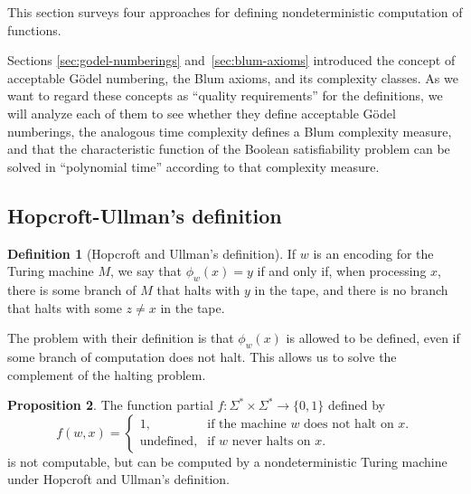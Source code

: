 \documentclass[12pt]{article}
\theoremstyle{definition}
\newtheorem{definition}{Definition}
\newtheorem{proposition}[definition]{Proposition}
\begin{document}
This section surveys four approaches
for defining nondeterministic computation of functions.

Sections \ref{sec:godel-numberings} and~\ref{sec:blum-axioms}
introduced the concept of acceptable Gödel numbering,
the Blum axioms,
and its complexity classes.
As we want to regard these concepts as ``quality requirements''
for the definitions,
we will analyze each of them to see whether they define acceptable Gödel numberings,
the analogous time complexity defines a Blum complexity measure,
and that the characteristic function of the Boolean satisfiability problem
can be solved in ``polynomial time'' according to that complexity measure.

\subsection{Hopcroft-Ullman's definition}
\label{sec:hopcroft-ullman}

\begin{definition}[Hopcroft and Ullman's definition\footnotemark]
    If $w$ is an encoding for the Turing machine $M$,
    we say that $\phi_w(x) = y$ if and only if,
    when processing $x$,
    there is some branch of $M$ that halts with $y$ in the tape,
    and there is no branch that halts with some $z \neq x$ in the tape.
\end{definition}

The problem with their definition is that $\phi_w(x)$ is allowed to be defined,
even if some branch of computation does not halt.
This allows us to solve the complement of the halting problem.

\begin{proposition}
    The function partial $f: \Sigma^* \times \Sigma^* \to \{0, 1\}$ defined by
    \begin{equation*}
        f(w, x) = \begin{cases}
            1, & \text{if the machine $w$ does not halt on $x$.} \\
            \text{undefined}, &\text{if $w$ never halts on $x$.}
        \end{cases}
    \end{equation*}
    is not computable,
    but can be computed by a nondeterministic Turing machine under
    Hopcroft and Ullman's definition.
\end{proposition}
\end{document}
